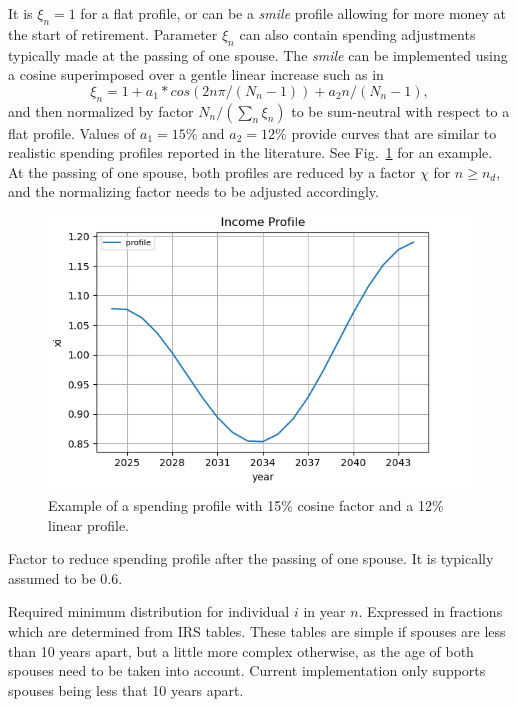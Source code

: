 \documentclass{report}[fleqn,12pt]
\begin{document}
\begin{description}[leftmargin=4em,style=multiline]
	It is $\xi_n =1$ for
	a flat profile, or can be a {\em smile} profile allowing for more money at the start
	of retirement. Parameter
	$\xi_n$ can also contain spending adjustments typically made at the passing of one spouse.
	The {\em smile} can be implemented using a cosine superimposed over a gentle linear increase
	such as in
	\begin{equation}
		\xi_n = 1 + a_1*cos(2n\pi/(N_n-1)) + a_2n/(N_n-1),
	\end{equation}
	and then normalized by factor $N_n/(\sum_n \xi_n )$ to be sum-neutral with respect to a flat profile.
	Values of $a_1 = 15\%$ and $a_2=12\%$ provide curves that are similar to realistic
		spending profiles reported in the literature. See Fig.~\ref{Fig:profile} for an example.
	At the passing of one spouse, both profiles are reduced by a factor $\chi$ for $n \ge n_d$,
	and the normalizing factor needs to be adjusted accordingly.
		\begin{figure}[t]
		\includegraphics{profile.png}
		\caption{\small Example of a spending profile with 15\% cosine factor and a 12\% linear
		profile. \label{Fig:profile}}
		\end{figure}
\item [$\chi$]
	Factor to reduce spending profile after the passing of one spouse. It is typically
	assumed to be 0.6.
\item [$\rho_{in}$]
	Required minimum distribution for individual $i$ in year $n$. Expressed in fractions
	which are determined from IRS tables. These tables are simple if spouses are less than 10 years apart,
	but a little more complex otherwise, as the age of both spouses need to be taken into account.
	Current implementation only supports spouses being less that 10 years apart.

\end{description}
\end{document}
